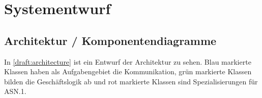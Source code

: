 \documentclass[
	12pt,
	table,
	bigheadings,
	ngerman,
	a4paper,
	BCOR5mm,
	DIV14,
	1.1headlines,
	pagesize,
	oneside,
	openright,
	titlepage,
	headsepline,
	nochapterprefix,
	bibtotoc,
	tocindent,
	listsindent,
	pointlessnumbers,
	cleardoubleempty,
	fleqn,
	halfparskip
]{scrbook}
\newcommand{\todo}[1]{\textcolor{red}{TODO: #1}}
\begin{document}
	\sloppy
	
	\setcounter{page}{0}
	
	
	
	
	
	
	
	\thispagestyle{empty}
	
	
	\clearpage	
	\hypersetup{allcolors=black}
	\tableofcontents
	\hypersetup{allcolors=blue}
	\newpage
	
	
	\setcounter{page}{1}
	
	
	
	
		
	
	
	
	
	
	
	
		
	\chapter{Systementwurf}
		\section{Architektur / Komponentendiagramme}
				
		In \autoref{draft:architecture} ist ein Entwurf der Architektur zu sehen.
		Blau markierte Klassen haben als Aufgabengebiet die Kommunikation, grün markierte Klassen bilden die Geschäftslogik ab und rot markierte Klassen sind Spezialisierungen für ASN.1.
		
\end{document}
